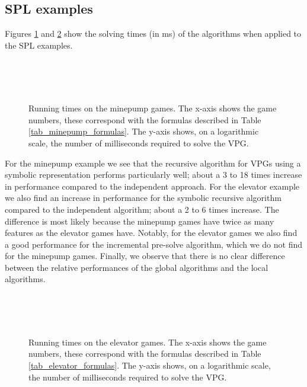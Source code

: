 \subsection{SPL examples}
Figures \ref{fig:results_minepump} and \ref{fig:results_elevator} show the solving times (in ms) of the algorithms when applied to the SPL examples.
\begin{figure}[H]
	\centering
	\begin{multicols}{2}
		\\\vfill
		\\
		\\\vfill
		
	\end{multicols}
	\caption{Running times on the minepump games. The x-axis shows the game numbers, these correspond with the formulas described in Table \ref{tab_minepump_formulas}. The y-axis shows, on a logarithmic scale, the number of milliseconds required to solve the VPG.}
	\label{fig:results_minepump}
\end{figure}%
For the minepump example we see that the recursive algorithm for VPGs using a symbolic representation performs particularly well; about a 3 to 18 times increase in performance compared to the independent approach. For the elevator example we also find an increase in performance for the symbolic recursive algorithm compared to the independent algorithm; about a 2 to 6 times increase. The difference is most likely because the minepump games have twice as many features as the elevator games have. Notably, for the elevator games we also find a good performance for the incremental pre-solve algorithm, which we do not find for the minepump games. Finally,  we observe that there is no clear difference between the relative performances of the global algorithms and the local algorithms.
\begin{figure}[H]
	\centering
	\begin{multicols}{2}
		\\\vfill
		\\
		\\\vfill
		
	\end{multicols}
	\caption{Running times on the elevator games. The x-axis shows the game numbers, these correspond with the formulas described in Table \ref{tab_elevator_formulas}. The y-axis shows, on a logarithmic scale, the number of milliseconds required to solve the VPG.}
	\label{fig:results_elevator}
\end{figure}%

